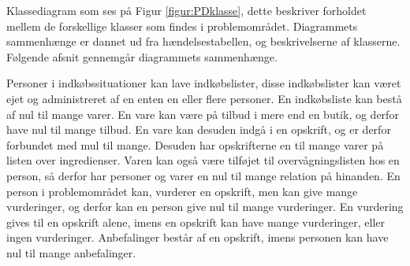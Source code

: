 Klassediagram som ses på Figur \ref{figur:PDklasse}, dette beskriver forholdet mellem de forskellige klasser som findes i problemområdet. Diagrammets sammenhænge er dannet ud fra hændelsestabellen, og beskrivelserne af klasserne. Følgende afsnit gennemgår diagrammets sammenhænge.

Personer i indkøbssituationer kan lave indkøbslister, disse indkøbslister kan været ejet og administreret af en enten en eller flere personer.
En indkøbsliste kan bestå af nul til mange varer.
En vare kan være på tilbud i mere end en butik, og derfor have nul til mange tilbud.
En vare kan desuden indgå i en opskrift, og er derfor forbundet med mul til mange.
Desuden har opskrifterne en til mange varer på listen over ingredienser.
Varen kan også være tilføjet til overvågningslisten hos en person, så derfor har personer og varer en nul til mange relation på hinanden.
En person i problemområdet kan, vurderer en opskrift, men kan give mange vurderinger, og derfor kan en person give nul til mange vurderinger. 
En vurdering gives til en opskrift alene, imens en opskrift kan have mange vurderinger, eller ingen vurderinger.
Anbefalinger består af en opskrift, imens personen kan have nul til mange anbefalinger.
